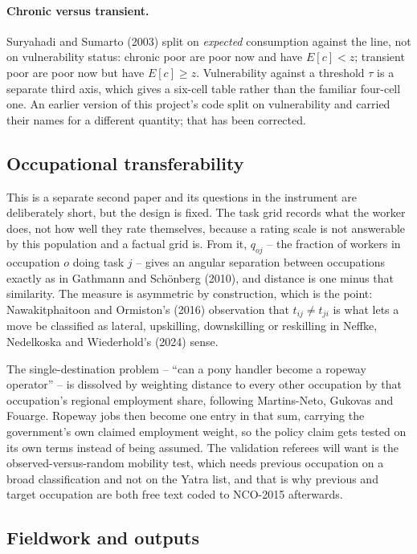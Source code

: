 \documentclass[11pt]{article}
\begin{document}
\paragraph{Chronic versus transient.} Suryahadi and Sumarto (2003) split on \emph{expected}
consumption against the line, not on vulnerability status: chronic poor are poor now and have
$E[c] < z$; transient poor are poor now but have $E[c] \geq z$. Vulnerability against a
threshold $\tau$ is a separate third axis, which gives a six-cell table rather than the familiar
four-cell one. An earlier version of this project's code split on vulnerability and carried
their names for a different quantity; that has been corrected.

\subsection{Occupational transferability}

This is a separate second paper and its questions in the instrument are deliberately short, but
the design is fixed. The task grid records what the worker does, not how well they rate
themselves, because a rating scale is not answerable by this population and a factual grid is.
From it, $q_{oj}$ -- the fraction of workers in occupation $o$ doing task $j$ -- gives an angular
separation between occupations exactly as in Gathmann and Schönberg (2010), and distance is one
minus that similarity. The measure is asymmetric by construction, which is the point:
Nawakitphaitoon and Ormiston's (2016) observation that $t_{ij} \neq t_{ji}$ is what lets a move
be classified as lateral, upskilling, downskilling or reskilling in Neffke, Nedelkoska and
Wiederhold's (2024) sense.

The single-destination problem -- ``can a pony handler become a ropeway operator'' -- is
dissolved by weighting distance to every other occupation by that occupation's regional
employment share, following Martins-Neto, Gukovas and Fouarge. Ropeway jobs then become one
entry in that sum, carrying the government's own claimed employment weight, so the policy claim
gets tested on its own terms instead of being assumed. The validation referees will want is the
observed-versus-random mobility test, which needs previous occupation on a broad classification
and not on the Yatra list, and that is why previous and target occupation are both free text
coded to NCO-2015 afterwards.

\subsection{Fieldwork and outputs}
\end{document}
